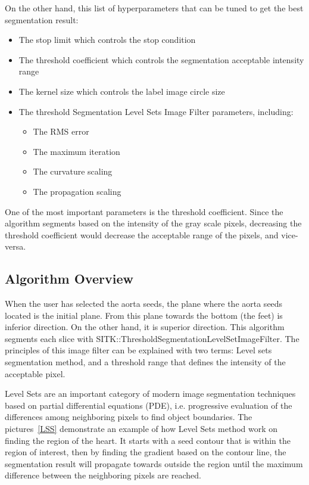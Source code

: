 On the other hand, this list of hyperparameters that can be tuned to get the best segmentation result:
\begin{itemize}
\item The stop limit which controls the stop condition
\item The threshold coefficient which controls the segmentation acceptable intensity range
\item The kernel size which controls the label image circle size 
\item The threshold Segmentation Level Sets Image Filter parameters, including:
\begin{itemize}
\item The RMS error
\item The maximum iteration
\item The curvature scaling
\item The propagation scaling
\end{itemize}
\end{itemize}

One of the most important parameters is the threshold coefficient. Since the algorithm segments based on the intensity of the gray scale pixels, decreasing the threshold coefficient would decrease the acceptable range of the pixels, and vice-versa. 


\subsection{Algorithm Overview} \label{algo}

When the user has selected the aorta seeds, the plane where the aorta seeds located is the initial plane. From this plane towards the bottom (the feet) is inferior direction. On the other hand, it is superior direction. This algorithm segments each slice with SITK::ThresholdSegmentationLevelSetImageFilter. The principles of this image filter can be explained with two terms: Level sets segmentation method, and a threshold range that defines the intensity of the acceptable pixel.

Level Sets are an important category of modern image segmentation techniques based on partial differential equations (PDE), i.e. progressive evaluation of the differences among neighboring pixels to find object boundaries. The pictures~\ref{LSS} demonstrate an example of how Level Sets method work on finding the region of the heart. It starts with a seed contour that is within the region of interest, then by finding the gradient based on the contour line, the segmentation result will propagate towards outside the region until the maximum difference between the neighboring pixels are reached.

